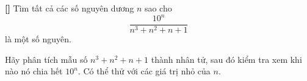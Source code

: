 \documentclass[../01-divisibility.tex]{subfiles}
\begin{document}
\begin{exercise*}\label{example:JPN-2015-MO-P1}\textbf{[]}
	Tìm tất cả các số nguyên dương \( n \) sao cho 
	\[
		\frac{10^n}{n^3 + n^2 + n + 1}
	\]
	là một số nguyên.
\end{exercise*}

\begin{remark*}
    Hãy phân tích mẫu số \( n^3 + n^2 + n + 1 \) thành nhân tử, sau đó kiểm tra xem khi nào nó chia hết \( 10^n \). Có thể thử với các giá trị nhỏ của \( n \).
\end{remark*}

\end{document}
